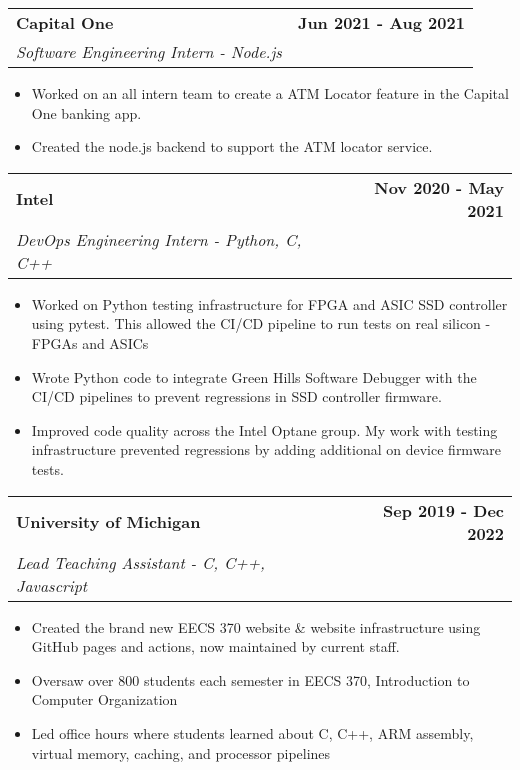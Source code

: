 \documentclass[11pt]{extreport}
\makeatletter
\newcommand{\resumeSubheading}[4]{
  \vspace{-1pt}
    \begin{tabular*}{1.0\textwidth}{l@{\extracolsep{\fill}}r}
      \textbf{#1} & \textbf{#2}  \vspace{1mm} \\
      {#3} & \textbf{#4} \\
    \end{tabular*}\vspace{-3pt}
}
\makeatother
\begin{document}
    \resumeSubheading{Capital One}{Jun 2021 - Aug 2021}
    {\textit{Software Engineering Intern - Node.js}}{}
    \begin{itemize}[leftmargin=*]
    \item[\textperiodcentered] Worked on an all intern team to create a ATM Locator feature in the Capital One banking app.
\vspace{-1.5mm}
        \item[\textperiodcentered] Created the node.js backend to support the ATM locator service.
    \end{itemize}
    
    \resumeSubheading{Intel}{Nov 2020 - May 2021}
    {\textit{DevOps Engineering Intern - Python, C, C++}}{}
    \begin{itemize}[leftmargin=*]
    \item[\textperiodcentered] Worked on Python testing infrastructure for FPGA and ASIC SSD controller using pytest. This allowed the CI/CD pipeline to run tests on real silicon - FPGAs and ASICs
\vspace{-1.5mm}
    \item[\textperiodcentered] Wrote Python code to integrate Green Hills Software Debugger with the CI/CD pipelines to prevent regressions in SSD controller firmware. 
\vspace{-1.5mm}
    \item[\textperiodcentered] Improved code quality across the Intel Optane group. My work with testing infrastructure prevented regressions by adding additional on device firmware tests. 
    \end{itemize}
    
    \resumeSubheading{University of Michigan}{Sep 2019 - Dec 2022}
    {\textit{Lead Teaching Assistant - C, C++, Javascript}}{}
    \begin{itemize}[leftmargin=*]
    \item[\textperiodcentered] Created the brand new EECS 370 website \& website infrastructure using GitHub pages and actions, now maintained by current staff.
\vspace{-1.5mm}
    \item[\textperiodcentered] Oversaw over 800 students each semester in EECS 370, Introduction to Computer Organization
\vspace{-1.5mm}
    \item[\textperiodcentered] Led office hours where students learned
    about C, C++, ARM assembly, virtual memory, caching, and processor pipelines
    \end{itemize}
\end{document}
